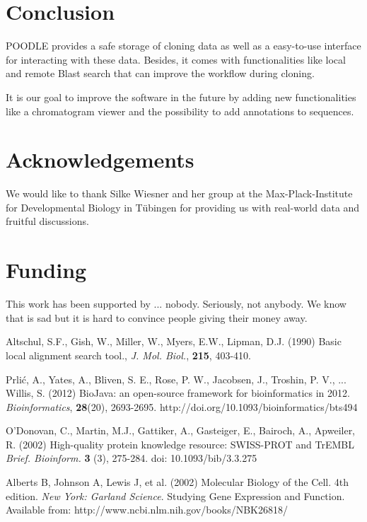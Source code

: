 \documentclass{bioinfo}
\begin{document}
\section{Conclusion}

POODLE provides a safe storage of cloning data as well as a easy-to-use interface for 
interacting with these data. Besides, it comes with functionalities like local and remote Blast 
search that can improve the workflow during cloning. 

It is our goal to improve the software in the future by adding new functionalities like a chromatogram 
viewer and the possibility to add annotations to sequences. 

\section*{Acknowledgements}

We would like to thank Silke Wiesner and her group at the Max-Plack-Institute for Developmental Biology 
in T\"{u}bingen for providing us with real-world data and fruitful discussions.

\section*{Funding}

This work has been supported by ... nobody. Seriously, not anybody. We know that is sad but it is hard 
to convince people giving their money away.

%
%
%
%
%
%
%
%
%


\begin{thebibliography}{}

Altschul, S.F., Gish, W., Miller, W., Myers, E.W., Lipman, D.J. (1990) Basic local alignment search tool., {\it J. Mol. Biol.}, {\bf 215}, 403-410.

Prli\'{c}, A., Yates, A., Bliven, S. E., Rose, P. W., Jacobsen, J., Troshin, P. V., ... Willis, S. (2012) BioJava: an open-source framework for bioinformatics in 2012. {\it Bioinformatics}, {\bf 28}(20), 2693-2695. http://doi.org/10.1093/bioinformatics/bts494

O'Donovan, C., Martin, M.J., Gattiker, A., Gasteiger, E., Bairoch, A., Apweiler, R. (2002) High-quality protein knowledge resource: SWISS-PROT and TrEMBL {\it Brief. Bioinform.}  {\bf 3} (3), 275-284. doi: 10.1093/bib/3.3.275 

Alberts B, Johnson A, Lewis J, et al. (2002) Molecular Biology of the Cell. 4th edition. {\it New York: Garland Science}. Studying Gene Expression and Function. Available from: http://www.ncbi.nlm.nih.gov/books/NBK26818/

\end{thebibliography}
\end{document}
